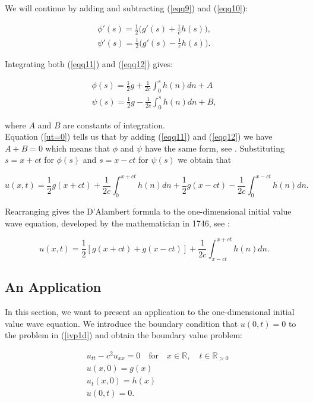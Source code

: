 \documentclass[a4paper, 12pt]{article}
\numberwithin{equation}{section}
\begin{document}
We will continue by adding and subtracting (\ref{eqq9}) and (\ref{eqq10}):

\begin{align} \label{eqq11}
    \phi'(s)=\frac{1}{2}\Big(g'(s)+\frac{1}{c}h(s)\Big),\\
    \label{eqq12}
    \psi'(s)=\frac{1}{2}\Big(g'(s)-\frac{1}{c}h(s)\Big).
\end{align}

Integrating both (\ref{eqq11}) and (\ref{eqq12}) gives:

\begin{equation}
    \begin{aligned}
    \phi(s)=\frac{1}{2}g+\frac{1}{2c}\int^s_0h(n)dn+A\\
    \psi(s)=\frac{1}{2}g-\frac{1}{2c}\int^s_0h(n)dn+B,
    \end{aligned}
\end{equation}

where $A$ and $B$ are constants of integration. \\

Equation (\ref{ut=0}) tells us that by adding (\ref{eqq11}) and (\ref{eqq12}) we
have $A+B=0$ which means that $\phi$ and $\psi$ have the same form, see
\cite{Str}. Substituting $s=x+ct$ for $\phi(s)$ and $s=x-ct$ for $\psi(s)$ we
obtain that

\begin{equation}
    u(x,t)=\frac{1}{2}g(x+ct)+\frac{1}{2c}\int^{x+ct}_0h(n)dn+\frac{1}{2}g(x-ct)-\frac{1}{2c}\int^{x-ct}_0h(n)dn.
\end{equation}

Rearranging gives the D'Alambert formula to the one-dimensional initial value
wave equation, developed by the mathematician in 1746, see \cite{Str}:

\begin{equation} \label{DAla}
    u(x,t)=\frac{1}{2}\left[g(x+ct)+g(x-ct)\right]+\frac{1}{2c}\int^{x+ct}_{x-ct}h(n)dn.
\end{equation}

\subsection{An Application} \label{anapplication}
In this section, we want to present an application to the one-dimensional
initial value wave equation. We introduce the boundary condition that $u(0,t)=0$
to the problem in (\ref{ivp1d}) and obtain the boundary value problem:

\begin{equation} \label{bvp1d}
    \begin{aligned}
    &u_{tt}-c^2u_{xx}=0 \quad \textrm {for} \quad x \in \mathbb{R}, \quad t \in \mathbb{R}_{>0}\\
    &u(x,0)=g(x)\\
    &u_t(x,0)=h(x)\\
    &u(0,t)=0.
    \end{aligned}
\end{equation}
\end{document}
